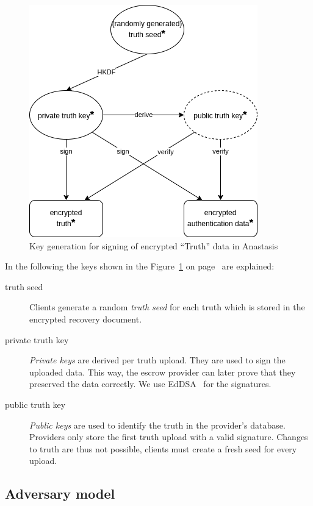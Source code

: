 \begin{figure}[H]
	\centering
	\includegraphics[scale=0.48]{images/truth_anastasis.png}
	\caption{Key generation for signing of encrypted ``Truth'' data in Anastasis}
	\label{fig:truth_keys}
\end{figure}

\noindent In the following the keys shown in the Figure~\ref{fig:truth_keys} on
page~\pageref{fig:truth_keys} are explained:
\begin{description}
\item[truth seed] {Clients generate a random {\em truth seed} for each truth
  which is stored in the encrypted recovery document.}
\item[private truth key] {{\em Private keys} are derived per truth upload. They
  are used to sign the uploaded data. This way, the escrow provider
  can later prove that they preserved the data correctly. We use EdDSA~\cite{josefsson2017} for
  the signatures.}
\item[public truth key] {{\em Public keys} are used to identify the truth
  in the provider's database. Providers only store the first truth upload with
  a valid signature. Changes to truth are thus not possible, clients must
  create a fresh seed for every upload.}
 \end{description}



\subsection{Adversary model}

